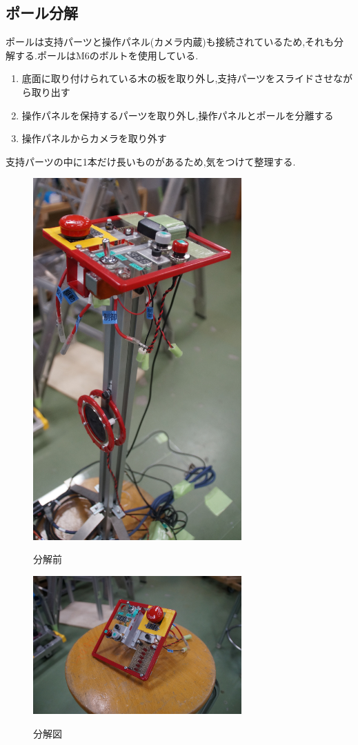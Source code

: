 \subsection{ポール分解}
ポールは支持パーツと操作パネル(カメラ内蔵)も接続されているため,それも分解する.ポールはM6のボルトを使用している.
\begin{enumerate}
 \item 底面に取り付けられている木の板を取り外し,支持パーツをスライドさせながら取り出す
 \item 操作パネルを保持するパーツを取り外し,操作パネルとポールを分離する 
 \item 操作パネルからカメラを取り外す
\end{enumerate}
支持パーツの中に1本だけ長いものがあるため,気をつけて整理する.
\begin{figure}[htp]
 \begin{center}
  \includegraphics[width=80mm]{img/hard/f6.jpg}
 　\caption{分解前}
  \label{fig:robot}%
 \end{center}
\end{figure}


\begin{figure}[htp]
 \begin{center}
  \includegraphics[width=80mm]{img/hard/f5.jpg}
 　\caption{分解図}
  \label{fig:robot}%
 \end{center}
\end{figure}
